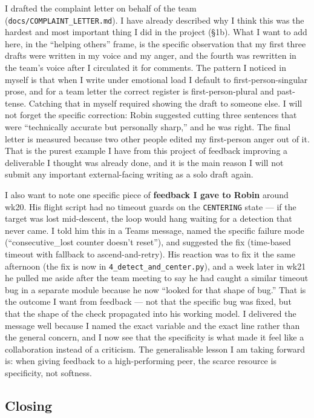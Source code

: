 I drafted the complaint letter on behalf of the team (\texttt{docs/COMPLAINT\_LETTER.md}). I have already described why I think this was the hardest and most important thing I did in the project (§1b). What I want to add here, in the ``helping others'' frame, is the specific observation that my first three drafts were written in my voice and my anger, and the fourth was rewritten in the team's voice after I circulated it for comments. The pattern I noticed in myself is that when I write under emotional load I default to first-person-singular prose, and for a team letter the correct register is first-person-plural and past-tense. Catching that in myself required showing the draft to someone else. I will not forget the specific correction: Robin suggested cutting three sentences that were ``technically accurate but personally sharp,'' and he was right. The final letter is measured because two other people edited my first-person anger out of it. That is the purest example I have from this project of feedback improving a deliverable I thought was already done, and it is the main reason I will not submit any important external-facing writing as a solo draft again.

I also want to note one specific piece of \textbf{feedback I gave to Robin} around wk20. His flight script had no timeout guards on the \texttt{CENTERING} state --- if the target was lost mid-descent, the loop would hang waiting for a detection that never came. I told him this in a Teams message, named the specific failure mode (``consecutive\_lost counter doesn't reset''), and suggested the fix (time-based timeout with fallback to ascend-and-retry). His reaction was to fix it the same afternoon (the fix is now in \texttt{4\_detect\_and\_center.py}), and a week later in wk21 he pulled me aside after the team meeting to say he had caught a similar timeout bug in a separate module because he now ``looked for that shape of bug.'' That is the outcome I want from feedback --- not that the specific bug was fixed, but that the shape of the check propagated into his working model. I delivered the message well because I named the exact variable and the exact line rather than the general concern, and I now see that the specificity is what made it feel like a collaboration instead of a criticism. The generalisable lesson I am taking forward is: when giving feedback to a high-performing peer, the scarce resource is specificity, not softness.

\subsection*{Closing}


